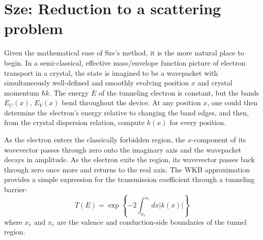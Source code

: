 \section{Sze: Reduction to a scattering problem}
Given the mathematical ease of Sze's method, it is the more natural place to begin.  In a semi-classical, effective mass/envelope function picture of electron transport in a crystal, the state is imagined to be a wavepacket with simultaneously well-defined and smoothly evolving position $x$ and crystal momentum $\hbar k$.  The energy $E$ of the tunneling electron is constant, but the bands $E_C(x)$, $E_V(x)$ bend throughout the device.  At any position $x$, one could then determine the electron's energy relative to changing the band edges, and then, from the crystal dispersion relation, compute $k(x)$ for every position.

As the electron enters the classically forbidden region, the $x$-component of its wavevector passes through zero onto the imaginary axis and the wavepacket decays in amplitude.  As the electron exits the region, its wavevector passes back through zero once more and returns to the real axis.  The WKB approximation provides a simple expression for the transmission coefficient through a tunneling barrier:
$$T(E)=\exp\left\{-2\int_{x_v}^{x_c}dx|k(x)|\right\}$$
where $x_v$ and $x_c$ are the valence and conduction-side boundaries of the tunnel region.